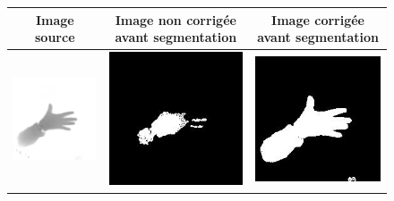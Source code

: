 \begin{figure}
\begin{tabular}{|c|c|c|}
\hline
Image source & Image non corrigée avant segmentation & Image corrigée avant segmentation\\
\hline
\includegraphics[scale=0.4]{correcSrc1.png} & \includegraphics[scale=0.4]{correcOut1-1.jpg} & \includegraphics[scale=0.4]{correcOut2-1.jpg} \\
\hline

\end{tabular}
\end{figure}
